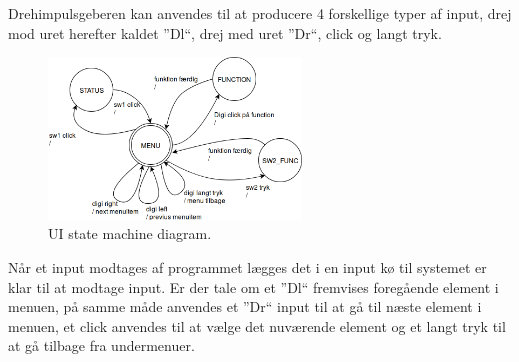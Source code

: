 Drehimpulsgeberen kan anvendes til at producere 4 forskellige typer af input, drej mod uret herefter kaldet ''Dl``, drej med uret ''Dr``, click og langt tryk.

\begin{figure} 
	\centering 
	\includegraphics[width= 0.6\textwidth]{billeder/ui_statemachine.png} 
	\caption{UI state machine diagram. } 
	\label{fig:uistatemachine} 
\end{figure}

Når et input  modtages af programmet lægges det i en input kø til systemet er klar til at modtage input. Er der tale om et ''Dl`` fremvises foregående element i menuen, på samme måde anvendes et ''Dr`` input til at gå til næste element i menuen, et click anvendes til at vælge det nuværende element og et langt tryk til at gå tilbage fra undermenuer.

